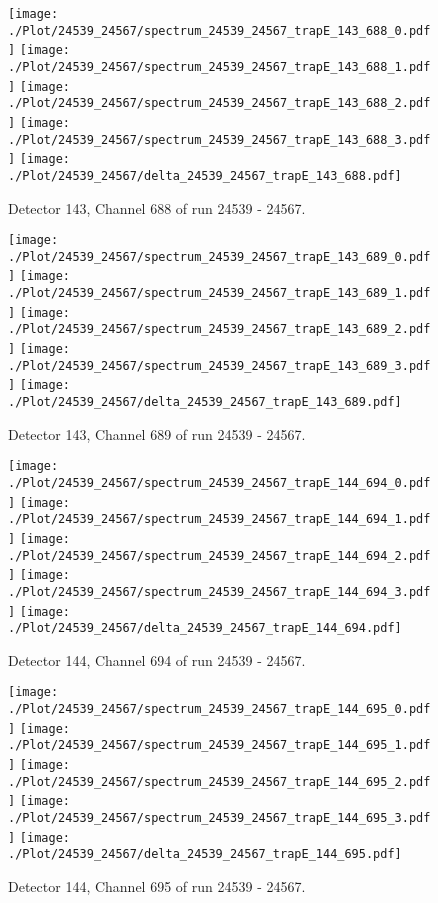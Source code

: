 \clearpage
\begin{figure}[hb]
\centering
\texttt{[image: ./Plot/24539\_24567/spectrum\_24539\_24567\_trapE\_143\_688\_0.pdf]}
\texttt{[image: ./Plot/24539\_24567/spectrum\_24539\_24567\_trapE\_143\_688\_1.pdf]}
\texttt{[image: ./Plot/24539\_24567/spectrum\_24539\_24567\_trapE\_143\_688\_2.pdf]}
\texttt{[image: ./Plot/24539\_24567/spectrum\_24539\_24567\_trapE\_143\_688\_3.pdf]}
\texttt{[image: ./Plot/24539\_24567/delta\_24539\_24567\_trapE\_143\_688.pdf]}
\caption{ Detector 143, Channel 688 of run 24539 - 24567.}
\label{fig:24539_24567_trapE_143_688}
\end{figure}
\clearpage
\begin{figure}[hb]
\centering
\texttt{[image: ./Plot/24539\_24567/spectrum\_24539\_24567\_trapE\_143\_689\_0.pdf]}
\texttt{[image: ./Plot/24539\_24567/spectrum\_24539\_24567\_trapE\_143\_689\_1.pdf]}
\texttt{[image: ./Plot/24539\_24567/spectrum\_24539\_24567\_trapE\_143\_689\_2.pdf]}
\texttt{[image: ./Plot/24539\_24567/spectrum\_24539\_24567\_trapE\_143\_689\_3.pdf]}
\texttt{[image: ./Plot/24539\_24567/delta\_24539\_24567\_trapE\_143\_689.pdf]}
\caption{ Detector 143, Channel 689 of run 24539 - 24567.}
\label{fig:24539_24567_trapE_143_689}
\end{figure}
\clearpage
\begin{figure}[hb]
\centering
\texttt{[image: ./Plot/24539\_24567/spectrum\_24539\_24567\_trapE\_144\_694\_0.pdf]}
\texttt{[image: ./Plot/24539\_24567/spectrum\_24539\_24567\_trapE\_144\_694\_1.pdf]}
\texttt{[image: ./Plot/24539\_24567/spectrum\_24539\_24567\_trapE\_144\_694\_2.pdf]}
\texttt{[image: ./Plot/24539\_24567/spectrum\_24539\_24567\_trapE\_144\_694\_3.pdf]}
\texttt{[image: ./Plot/24539\_24567/delta\_24539\_24567\_trapE\_144\_694.pdf]}
\caption{ Detector 144, Channel 694 of run 24539 - 24567.}
\label{fig:24539_24567_trapE_144_694}
\end{figure}
\clearpage
\begin{figure}[hb]
\centering
\texttt{[image: ./Plot/24539\_24567/spectrum\_24539\_24567\_trapE\_144\_695\_0.pdf]}
\texttt{[image: ./Plot/24539\_24567/spectrum\_24539\_24567\_trapE\_144\_695\_1.pdf]}
\texttt{[image: ./Plot/24539\_24567/spectrum\_24539\_24567\_trapE\_144\_695\_2.pdf]}
\texttt{[image: ./Plot/24539\_24567/spectrum\_24539\_24567\_trapE\_144\_695\_3.pdf]}
\texttt{[image: ./Plot/24539\_24567/delta\_24539\_24567\_trapE\_144\_695.pdf]}
\caption{ Detector 144, Channel 695 of run 24539 - 24567.}
\label{fig:24539_24567_trapE_144_695}
\end{figure}
